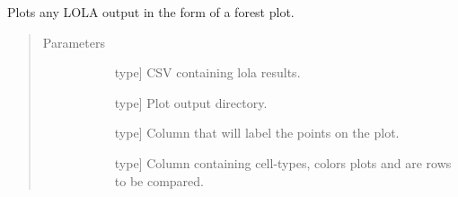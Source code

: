 \documentclass[letterpaper,10pt,english]{sphinxmanual}
\begin{document}
\begin{fulllineitems}
\label{\detokenize{index:methylnet.interpretation_classes.plot_lola_output_}}
Plots any LOLA output in the form of a forest plot.
\begin{quote}\begin{description}
\item[{Parameters}] \leavevmode\begin{description}
\item[{}] \leavevmode{[}type{]}
CSV containing lola results.

\item[{}] \leavevmode{[}type{]}
Plot output directory.

\item[{}] \leavevmode{[}type{]}
Column that will label the points on the plot.

\item[{}] \leavevmode{[}type{]}
Column containing cell-types, colors plots and are rows to be compared.

\end{description}

\end{description}\end{quote}

\end{fulllineitems}

\end{document}
